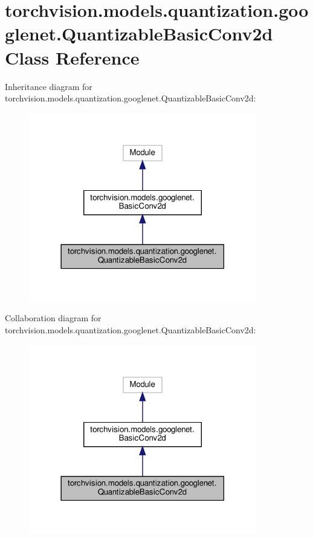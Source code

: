 \hypertarget{classtorchvision_1_1models_1_1quantization_1_1googlenet_1_1QuantizableBasicConv2d}{}\section{torchvision.\+models.\+quantization.\+googlenet.\+Quantizable\+Basic\+Conv2d Class Reference}
\label{classtorchvision_1_1models_1_1quantization_1_1googlenet_1_1QuantizableBasicConv2d}


Inheritance diagram for torchvision.\+models.\+quantization.\+googlenet.\+Quantizable\+Basic\+Conv2d\+:
\nopagebreak
\begin{figure}[H]
\begin{center}
\leavevmode
\includegraphics[width=282pt]{classtorchvision_1_1models_1_1quantization_1_1googlenet_1_1QuantizableBasicConv2d__inherit__graph}
\end{center}
\end{figure}


Collaboration diagram for torchvision.\+models.\+quantization.\+googlenet.\+Quantizable\+Basic\+Conv2d\+:
\nopagebreak
\begin{figure}[H]
\begin{center}
\leavevmode
\includegraphics[width=282pt]{classtorchvision_1_1models_1_1quantization_1_1googlenet_1_1QuantizableBasicConv2d__coll__graph}
\end{center}
\end{figure}
